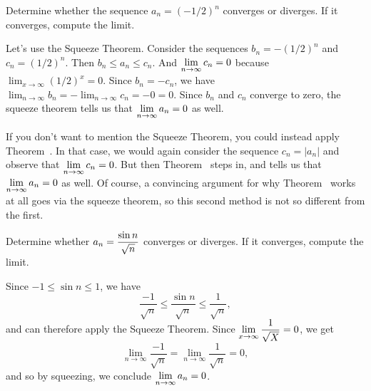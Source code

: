\begin{example}
Determine whether the sequence $a_n = (-1/2)^n$ converges or
diverges. If it converges, compute the limit.
\end{example}


\begin{solution}
  Let's use the Squeeze Theorem.  Consider the sequences $b_n =
  -(1/2)^n$ and $c_n = (1/2)^n$.  Then $b_n \leq a_n \leq c_n$.  And
  $\displaystyle\lim_{n \to \infty} c_n = 0$ because $\lim_{x \to \infty}
  (1/2)^x = 0$.  Since $b_n = - c_n$, we have $\lim_{n \to \infty} b_n
  = - \lim_{n \to \infty} c_n = -0 = 0$.  Since $b_n$ and $c_n$
  converge to zero, the squeeze theorem tells us that $\displaystyle\lim_{n \to
    \infty} a_n = 0$ as well.

  If you don't want to mention the Squeeze Theorem, you could instead
  apply Theorem~.  In that case, we
  would again consider the sequence $c_n = |a_n|$ and observe that
  $\displaystyle\lim_{n \to \infty} c_n = 0$.  But then
  Theorem~ steps in, and tells us
  that $\displaystyle\lim_{n \to \infty} a_n = 0$ as well.  Of course, a
  convincing argument for why Theorem~ works at all goes via the squeeze theorem, so this
  second method is not so different from the first.
\end{solution}

\begin{example}
Determine whether $a_n = \displaystyle\frac{\sin n}{\sqrt{n}}$ converges or
diverges. If it converges, compute the limit. 
\end{example}

\begin{solution}
Since $-1 \leq \sin n \leq 1$, we have 
$$
\frac{-1}{\sqrt{n}} \leq \frac{\sin n}{\sqrt{n}} \leq \frac{1}{\sqrt{n}},
$$ 
and can therefore apply the Squeeze Theorem.  Since $\displaystyle\lim_{x \to \infty} \frac{1}{\sqrt{X}} = 0$, we get
$$
\lim_{n \to \infty} \frac{-1}{\sqrt{n}} = \lim_{n \to \infty} \frac{1}{\sqrt{n}} = 0,
$$
and so by squeezing, we conclude $\displaystyle\lim_{n \to \infty} a_n = 0$.
\end{solution}


